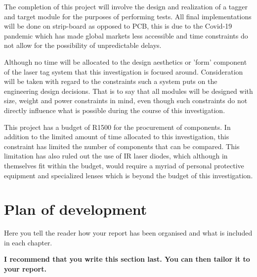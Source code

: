 The completion of this project will involve the design and realization of a tagger and target module for the purposes of performing tests. All final implementations will be done on strip-board as opposed to PCB, this is due to the Covid-19 pandemic which has made global markets less accessible and time constraints do not allow for the possibility of unpredictable delays.

Although no time will be allocated to the design aesthetics or 'form' component of the laser tag system that this investigation is focused around. Consideration will be taken with regard to the constraints such a system puts on the engineering design decisions. That is to say that all modules will be designed with size, weight and power constraints in mind, even though such constraints do not directly influence what is possible during the course of this investigation.

This project has a budget of R1500 for the procurement of components. In addition to the limited amount of time allocated to this investigation, this constraint has limited the number of components that can be compared. This limitation has also ruled out the use of IR laser diodes, which although in themselves fit within the budget, would require a myriad of personal protective equipment and specialized lenses which is beyond the budget of this investigation.



\section{Plan of development}
Here you tell the reader how your report has been organised and what is included in each
chapter.

{\bf I recommend that you write this section last. You can then tailor it to your report.}
